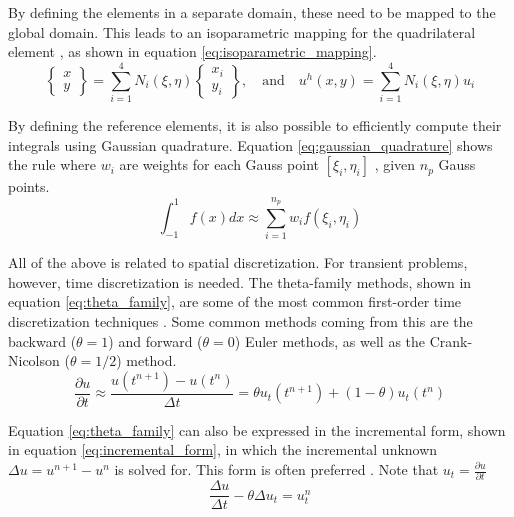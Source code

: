 By defining the elements in a separate domain, these need to be mapped to the global domain. This leads to an isoparametric mapping for the quadrilateral element \cite{Donea_Huerta_2004}, as shown in equation \ref{eq:isoparametric_mapping}.
\begin{equation}
	\begin{Bmatrix} x \\ y \end{Bmatrix} = \sum_{i=1}^4 N_i(\xi,\eta)\begin{Bmatrix} x_i \\ y_i \end{Bmatrix}, \quad \text{and} \quad u^h(x,y)=\sum_{i=1}^4 N_i(\xi,\eta)u_i
	\label{eq:isoparametric_mapping}
\end{equation}

By defining the reference elements, it is also possible to efficiently compute their integrals using Gaussian quadrature. Equation \ref{eq:gaussian_quadrature} shows the rule where $w_i$ are weights for each Gauss point $[\xi_i,\eta_i]$ \cite{McClarren_2018}, given $n_p$ Gauss points.
\begin{equation}
	\int_{-1}^{1}f(x)dx \approx \sum_{i=1}^{n_p}w_i f(\xi_i,\eta_i)
	\label{eq:gaussian_quadrature}
\end{equation}

All of the above is related to spatial discretization. For transient problems, however, time discretization is needed. The theta-family methods, shown in equation \ref{eq:theta_family}, are some of the most common first-order time discretization techniques \cite{Donea_Huerta_2004}. Some common methods coming from this are the backward ($\theta=1$) and forward ($\theta=0$) Euler methods, as well as the Crank-Nicolson ($\theta = 1/2$) method.
\begin{equation}
	\frac{\partial u}{\partial t} \approx \frac{u(t^{n+1})-u(t^n)}{\Delta t} = \theta u_t(t^{n+1}) + (1 - \theta)u_t(t^n)
	\label{eq:theta_family}
\end{equation}

Equation \ref{eq:theta_family} can also be expressed in the incremental form, shown in equation \ref{eq:incremental_form}, in which the incremental unknown $\Delta u = u^{n+1}-u^n$ is solved for. This form is often preferred \cite{Donea_Huerta_2004}. Note that $u_t=\frac{\partial u}{\partial t}$
\begin{equation}
	\frac{\Delta u}{\Delta t}-\theta\Delta u_t = u_t^n 
	\label{eq:incremental_form}
\end{equation}

